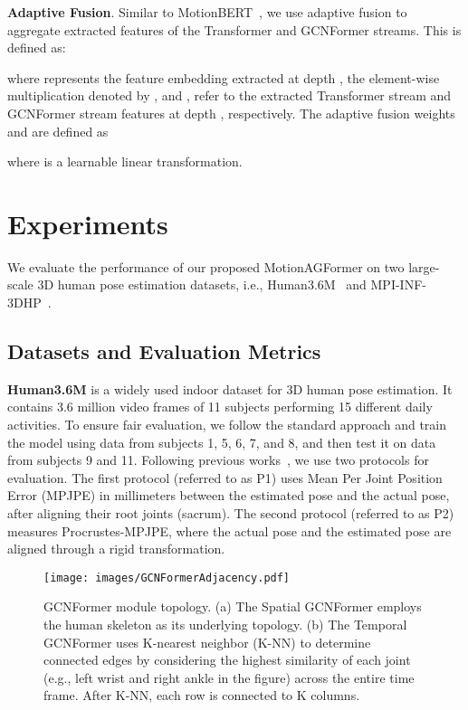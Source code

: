 \documentclass[10pt,twocolumn,letterpaper]{article}
\begin{document}
    \textbf{Adaptive Fusion}. Similar to MotionBERT~\cite{motionbert}, we use adaptive fusion to aggregate extracted features of the Transformer and GCNFormer streams. This is defined as:
    
    where  represents the feature embedding extracted at depth , the element-wise multiplication denoted by , and ,  refer to the extracted Transformer stream and GCNFormer stream features at depth , respectively. The adaptive fusion weights  and  are defined as
    
    where  is a learnable linear transformation.



    
\section{Experiments}
    We evaluate the performance of our proposed MotionAGFormer on two large-scale 3D human pose estimation datasets, i.e., Human3.6M~\cite{ionescu2013human3} and MPI-INF-3DHP~\cite{mehta2017monocular}.
    \subsection{Datasets and Evaluation Metrics}
    \textbf{Human3.6M} is a widely used indoor dataset for 3D human pose estimation. It contains 3.6 million video frames of 11 subjects performing 15 different daily activities. To ensure fair evaluation, we follow the standard approach and train the model using data from subjects 1, 5, 6, 7, and 8, and then test it on data from subjects 9 and 11. Following previous works~\cite{poseformerv2, STCFormer}, we use two protocols for evaluation. The first protocol (referred to as P1) uses Mean Per Joint Position Error (MPJPE) in millimeters between the estimated pose and the actual pose, after aligning their root joints (sacrum). The second protocol (referred to as P2) measures Procrustes-MPJPE, where the actual pose and the estimated pose are aligned through a rigid transformation.
    
    \begin{figure}[t]
      \texttt{[image: images/GCNFormerAdjacency.pdf]}
      \caption{GCNFormer module topology. (a) The Spatial GCNFormer employs the human skeleton as its underlying topology. (b) The Temporal GCNFormer uses K-nearest neighbor (K-NN) to determine connected edges by considering the highest similarity of each joint (e.g., left wrist and right ankle in the figure) across the entire time frame. After K-NN, each row is connected to K columns.}
      \label{fig:graphtopology}
    \end{figure}
    
\end{document}
